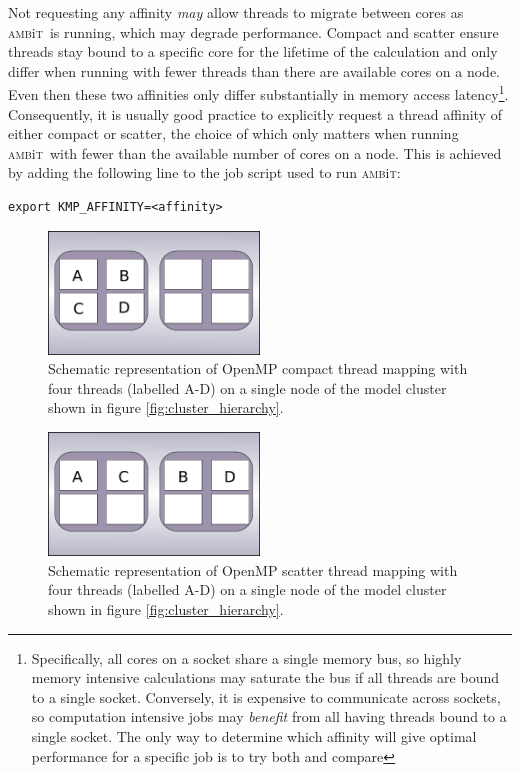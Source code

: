 \documentclass{report}
\newcommand{\ambit}{\textsc{amb}{\footnotesize i}\textsc{t}}
\begin{document}
Not requesting any affinity \emph{may} allow threads to migrate between cores as \ambit\ 
is running, which may degrade performance. Compact and scatter ensure threads stay bound to a specific
core for the lifetime of the calculation and only differ when running with fewer 
threads than there are available cores on a node. Even then these two affinities only differ 
substantially in memory access latency\footnote{Specifically, all cores on a
socket share a single memory bus, so highly memory intensive calculations may saturate the bus if all
threads are bound to a single socket. Conversely, it is expensive to communicate across sockets, so
computation intensive jobs may \emph{benefit} from all having threads bound to a single socket. The only
way to determine which affinity will give optimal performance for a specific job is to try both and 
compare}. Consequently, it is usually good practice to explicitly request a thread affinity of either 
compact or scatter, the choice of which only matters when running \ambit\ with fewer than the available
number of cores on a node. This is achieved by adding the following line to the job script used to run
\ambit:

\begin{verbatim}
export KMP_AFFINITY=<affinity>
\end{verbatim}

\begin{figure}
\includegraphics[width=0.5\textwidth]{omp_compact.pdf}
\caption{Schematic representation of OpenMP compact thread mapping with four threads (labelled A-D) on
a single node of the model cluster shown in figure \ref{fig:cluster_hierarchy}.}
\label{fig:omp_compact}
\end{figure}

\begin{figure}
\includegraphics[width=0.5\textwidth]{omp_scatter.pdf}
\caption{Schematic representation of OpenMP scatter thread mapping with four threads (labelled A-D) on
a single node of the model cluster shown in figure \ref{fig:cluster_hierarchy}.}
\label{fig:omp_scatter}
\end{figure}
\end{document}
